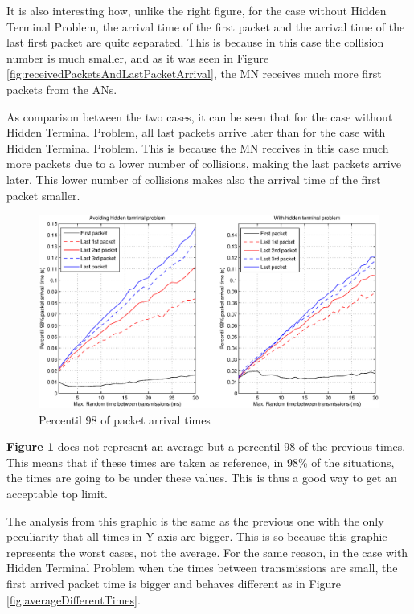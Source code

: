 It is also interesting how, unlike the right figure, for the case without Hidden Terminal Problem, the arrival time of the first packet and the arrival 
time of the last first packet are quite separated. This is because in this case the collision number is much smaller, and as it was seen in Figure 
\ref{fig:receivedPacketsAndLastPacketArrival}, the \ac{MN} receives much more first packets from the \acp{AN}.

As comparison between the two cases, it can be seen that for the case without Hidden Terminal Problem, all last packets arrive later than for the
case with Hidden Terminal Problem. This is because the \ac{MN} receives in this case much more packets due to a lower number of collisions, 
making the last packets arrive later. This lower number of collisions makes also the arrival time of the first packet smaller.

\begin{figure}[ht]
 \begin{center}
  \includegraphics[width=1\textwidth]{percentil98differentTimes.eps}
 \end{center}
 \caption{Percentil 98 of packet arrival times}
 \label{fig:percentil98differentTimes}
\end{figure}

\textbf{Figure \ref{fig:percentil98differentTimes}} does not represent an average but a percentil 98 of the previous times. This means that 
if these times are taken as reference, in 98\% of the situations, the times are going to be under these values. This is thus a good way to get 
an acceptable top limit.

The analysis from this graphic is the same as the previous one with the only peculiarity that all times in Y axis are bigger. This is so because
this graphic represents the worst cases, not the average. For the same reason, in the case with Hidden Terminal Problem when the times between
transmissions are small, the first arrived packet time is bigger and behaves different as in Figure \ref{fig:averageDifferentTimes}.

